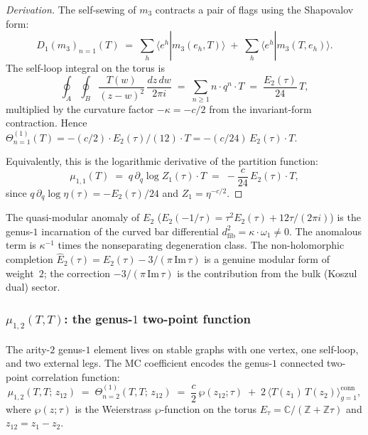 \documentclass[11pt]{article}
\begin{document}
\begin{proof}[Derivation]
The self-sewing of $m_3$ contracts a pair of flags using the
Shapovalov form:
\[
D_1(m_3)_{n=1}(T)
\;=\;
\sum_{h} \langle e^h | m_3(e_h, T) \rangle
\;+\;
\sum_{h} \langle e^h | m_3(T, e_h) \rangle.
\]
The self-loop integral on the torus is
\[
\oint_A \oint_B \frac{T(w)}{(z-w)^2}\,\frac{dz\,dw}{2\pi i}
\;=\;
\sum_{n \geq 1} n\cdot q^n \cdot T
\;=\;
\frac{E_2(\tau)}{24}\,T,
\]
multiplied by the curvature factor $-\kappa = -c/2$ from the
invariant-form contraction.  Hence
$\Theta^{(1)}_{n=1}(T) = -(c/2)\cdot E_2(\tau)/(12)\cdot T =
-(c/24)\,E_2(\tau) \cdot T$.

Equivalently, this is the logarithmic derivative of the partition
function:
\[
\mu_{1,1}(T)
\;=\;
q\,\partial_q \log Z_1(\tau) \cdot T
\;=\;
-\frac{c}{24}\,E_2(\tau) \cdot T,
\]
since $q\,\partial_q\log\eta(\tau) = -E_2(\tau)/24$
and $Z_1 = \eta^{-c/2}$.
\end{proof}

\begin{remark}
The quasi-modular anomaly of $E_2$
($E_2(-1/\tau) = \tau^2 E_2(\tau) + 12\tau/(2\pi i)$)
is the genus-$1$ incarnation of the curved bar differential
$d_{\mathrm{fib}}^2 = \kappa \cdot \omega_1 \neq 0$.
The anomalous term is $\kappa^{-1}$ times the nonseparating
degeneration class.  The non-holomorphic completion
$\widehat{E}_2(\tau) = E_2(\tau) - 3/(\pi\,\mathrm{Im}\,\tau)$
is a genuine modular form of weight~$2$; the correction
$-3/(\pi\,\mathrm{Im}\,\tau)$ is the contribution from the
bulk (Koszul dual) sector.
\end{remark}

\subsubsection{$\mu_{1,2}(T,T)$: the genus-$1$ two-point function}

The arity-$2$ genus-$1$ element lives on stable graphs with
one vertex, one self-loop, and two external legs.  The MC coefficient
encodes the genus-$1$ connected two-point correlation function:
\begin{equation}\label{eq:wn-mu12}
\mu_{1,2}(T,T;\,z_{12})
\;=\;
\Theta^{(1)}_{n=2}(T,T;\,z_{12})
\;=\;
\frac{c}{2}\,\wp(z_{12};\tau)
\;+\;
2\,\langle T(z_1)\,T(z_2) \rangle_{g=1}^{\mathrm{conn}},
\end{equation}
where $\wp(z;\tau)$ is the Weierstrass $\wp$-function on the
torus $E_\tau = \mathbb{C}/(\mathbb{Z} + \mathbb{Z}\tau)$ and
$z_{12} = z_1 - z_2$.
\end{document}
